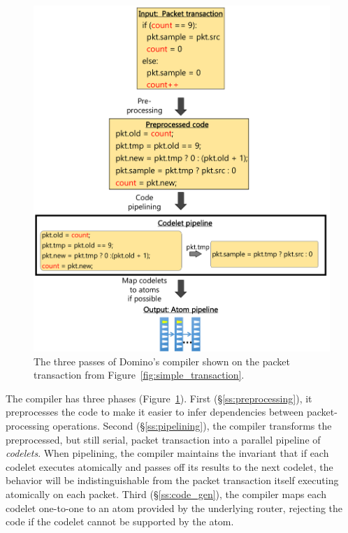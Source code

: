 \begin{figure}[!t]
\includegraphics[width=\textwidth]{compiler_passes_example.pdf}
\caption{The three passes of Domino's compiler shown on the packet transaction
from Figure~\ref{fig:simple_transaction}.}
\label{fig:compiler_passes_example}
\end{figure}

The compiler has three phases (Figure~\ref{fig:compiler_passes_example}). First
(\S\ref{ss:preprocessing}), it preprocesses the code to make it easier to infer
dependencies between packet-processing operations. Second
(\S\ref{ss:pipelining}), the compiler transforms the preprocessed, but still
serial, packet transaction into a parallel pipeline of {\em codelets}.  When
pipelining, the compiler maintains the invariant that if each codelet executes
atomically and passes off its results to the next codelet, the behavior will be
indistinguishable from the packet transaction itself executing atomically on
each packet. Third (\S\ref{ss:code_gen}), the compiler maps each codelet
one-to-one to an atom provided by the underlying router, rejecting the code if
the codelet cannot be supported by the atom.

